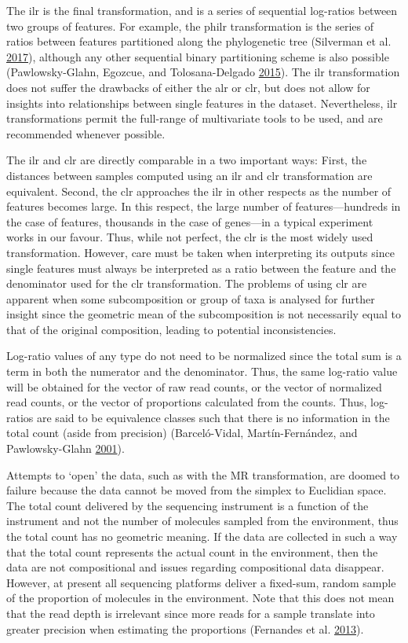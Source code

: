 \documentclass[onecolumn]{book}
\theoremstyle{definition}
\theoremstyle{definition}
\theoremstyle{definition}
\theoremstyle{remark}
\begin{document}
The ilr is the final transformation, and is a series of sequential
log-ratios between two groups of features. For example, the philr
transformation is the series of ratios between features partitioned
along the phylogenetic tree (Silverman et al.
\protect\hyperlink{ref-Silverman:2017aa}{2017}), although any other
sequential binary partitioning scheme is also possible (Pawlowsky-Glahn,
Egozcue, and Tolosana-Delgado
\protect\hyperlink{ref-pawlowsky2015modeling}{2015}). The ilr
transformation does not suffer the drawbacks of either the alr or clr,
but does not allow for insights into relationships between single
features in the dataset. Nevertheless, ilr transformations permit the
full-range of multivariate tools to be used, and are recommended
whenever possible.

The ilr and clr are directly comparable in a two important ways: First,
the distances between samples computed using an ilr and clr
transformation are equivalent. Second, the clr approaches the ilr in
other respects as the number of features becomes large. In this respect,
the large number of features---hundreds in the case of features,
thousands in the case of genes---in a typical experiment works in our
favour. Thus, while not perfect, the clr is the most widely used
transformation. However, care must be taken when interpreting its
outputs since single features must always be interpreted as a ratio
between the feature and the denominator used for the clr transformation.
The problems of using clr are apparent when some subcomposition or group
of taxa is analysed for further insight since the geometric mean of the
subcomposition is not necessarily equal to that of the original
composition, leading to potential inconsistencies.

Log-ratio values of any type do not need to be normalized since the
total sum is a term in both the numerator and the denominator. Thus, the
same log-ratio value will be obtained for the vector of raw read counts,
or the vector of normalized read counts, or the vector of proportions
calculated from the counts. Thus, log-ratios are said to be equivalence
classes such that there is no information in the total count (aside from
precision) (Barceló-Vidal, Martín-Fernández, and Pawlowsky-Glahn
\protect\hyperlink{ref-barcelo:2001}{2001}).

Attempts to `open' the data, such as with the MR transformation, are
doomed to failure because the data cannot be moved from the simplex to
Euclidian space. The total count delivered by the sequencing instrument
is a function of the instrument and not the number of molecules sampled
from the environment, thus the total count has no geometric meaning. If
the data are collected in such a way that the total count represents the
actual count in the environment, then the data are not compositional and
issues regarding compositional data disappear. However, at present all
sequencing platforms deliver a fixed-sum, random sample of the
proportion of molecules in the environment. Note that this does not mean
that the read depth is irrelevant since more reads for a sample
translate into greater precision when estimating the proportions
(Fernandes et al. \protect\hyperlink{ref-fernandes:2013}{2013}).
\end{document}
